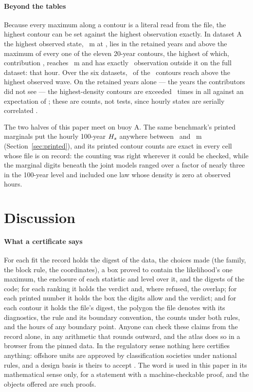 \documentclass[preprint,11pt,authoryear]{elsarticle}
\begin{document}
\paragraph{Beyond the tables} Because every maximum along a contour is a literal read from the file, the highest contour can be set against the highest observation exactly. In dataset A the highest observed state, \EMaxA\ m at \EMaxAWhen, lies in the retained years and above the maximum of every one of the eleven 20-year contours, the highest of which, contribution \EMaxAHighestWho, reaches \EMaxAHighestContour\ m and has exactly \EHDAOut\ observation outside it on the full dataset: that hour. Over the six datasets, \EAboveObservedTotal\ of the \EContours\ contours reach above the highest observed wave. On the retained years alone --- the years the contributors did not see --- the highest-density contours are exceeded \ERetHDSum\ times in all against an expectation of \ERetExpectedSumTotal; these are counts, not tests, since hourly states are serially correlated \citep{haselsteiner2021}.

The two halves of this paper meet on buoy A. The same benchmark's printed marginals put the hourly 100-year $H_s$ anywhere between \BSpreadLo\ and \BSpreadHi\ m (Section~\ref{sec:printed}), and its printed contour counts are exact in every cell whose file is on record: the counting was right wherever it could be checked, while the marginal digits beneath the joint models ranged over a factor of nearly three in the 100-year level and included one law whose density is zero at observed hours.

\section{Discussion}\label{sec:discussion}

\paragraph{What a certificate says}
For each fit the record holds the digest of the data, the choices made (the family, the block rule, the coordinates), a box proved to contain the likelihood's one maximum, the enclosure of each statistic and level over it, and the digests of the code; for each ranking it holds the verdict and, where refused, the overlap; for each printed number it holds the box the digits allow and the verdict; and for each contour it holds the file's digest, the polygon the file denotes with its diagnostics, the rule and its boundary convention, the counts under both rules, and the hours of any boundary point. Anyone can check these claims from the record alone, in any arithmetic that rounds outward, and the atlas does so in a browser from the pinned data. In the regulatory sense nothing here certifies anything: offshore units are approved by classification societies under national rules, and a design basis is theirs to accept \citep{dnv2021,iso19901}. The word is used in this paper in its mathematical sense only, for a statement with a machine-checkable proof, and the objects offered are such proofs.
\end{document}
